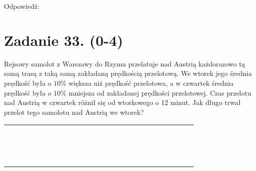 \documentclass[10pt]{article}
\begin{document}
Odpowiedź:

\section*{Zadanie 33. (0-4)}
Rejsowy samolot z Warszawy do Rzymu przelatuje nad Austrią każdorazowo tą samą trasą z taką samą zakładaną prędkością przelotową. We wtorek jego średnia prędkość była o \(10 \%\) większa niż prędkość przelotowa, a w czwartek średnia prędkość była o \(10 \%\) mniejsza od zakładanej prędkości przelotowej. Czas przelotu nad Austrią w czwartek różnił się od wtorkowego o 12 minut. Jak długo trwał przelot tego samolotu nad Austrią we wtorek?

\begin{center}
\begin{tabular}{|c|c|c|c|c|c|c|c|c|c|c|c|c|c|c|c|c|c|c|c|c|c|c|c|}
\hline
 &  &  &  &  &  &  &  &  &  &  &  &  &  &  &  &  &  &  &  &  &  &  &  \\
\hline
 &  &  &  &  &  &  &  &  &  &  &  &  &  &  &  &  &  &  &  &  &  &  &  \\
\hline
 &  &  &  &  &  &  &  &  &  &  &  &  &  &  &  &  &  &  &  &  &  &  &  \\
\hline
 &  &  &  &  &  &  &  &  &  &  &  &  &  &  &  &  &  &  &  &  &  &  &  \\
\hline
 &  &  &  &  &  &  &  &  &  &  &  &  &  &  &  &  &  &  &  &  &  &  &  \\
\hline
 &  &  &  &  &  &  &  &  &  &  &  &  &  &  &  &  &  &  &  &  &  &  &  \\
\hline
 &  &  &  &  &  &  &  &  &  &  &  &  &  &  &  &  &  &  &  &  &  &  &  \\
\hline
 &  &  &  &  &  &  &  &  &  &  &  &  &  &  &  &  &  &  &  &  &  &  &  \\
\hline
 &  &  &  &  &  &  &  &  &  &  &  &  &  &  &  &  &  &  &  &  &  &  &  \\
\hline
 &  &  &  &  &  &  &  &  &  &  &  &  &  &  &  &  &  &  &  &  &  &  &  \\
\hline
 &  &  &  &  &  &  &  &  &  &  &  &  &  &  &  &  &  &  &  &  &  &  &  \\
\hline
 &  &  &  &  &  &  &  &  &  &  &  &  &  &  &  &  &  &  &  &  &  &  &  \\
\hline
 &  &  &  &  &  &  &  &  &  &  &  &  &  &  &  &  &  &  &  &  &  &  &  \\
\hline
 &  &  &  &  &  &  &  &  &  &  &  &  &  &  &  &  &  &  &  &  &  &  &  \\
\hline
 &  &  &  &  &  &  &  &  &  &  &  &  &  &  &  &  &  &  &  &  &  &  &  \\

\end{tabular}
\end{center}
\end{document}

